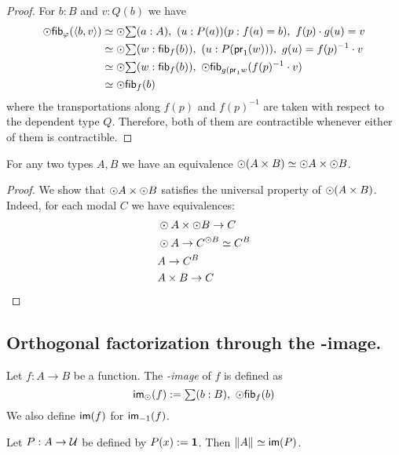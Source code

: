 \begin{proof}
For $b:B$ and $v:Q(b)$ we have
\begin{align*}
\modal\hfib{\varphi}{\pairr{b,v}} & \simeq \modal\sm{a:A}(u:P(a))(p:f(a)= b),\ f(p)\cdot g(u)= v\\
& \simeq \modal\sm{w:\hfib{f}b}(u:P(\proj1(w))),\ g(u)= f(p)^{-1}\cdot v\\
& \simeq \modal\sm{w:\hfib{f}b}\modal\hfib{g(\proj1 w}{f(p)^{-1}\cdot v}\\
& \simeq \modal\hfib{f}b
\end{align*}
where the transportations along $f(p)$ and $f(p)^{-1}$ are taken with respect to the dependent type $Q$. Therefore, both of them are
contractible whenever either of them is contractible.
\end{proof}

\begin{lem}\label{cor:trunc_prod}
For any two types $A,B$ we have an equivalence $\odot (A\times B) \simeq
\odot A \times \odot B$.
\end{lem}
\begin{proof}
 We show that $\odot A \times \odot B$ satisfies the universal property of $\odot (A\times B)$.
 Indeed, for each modal $C$ we have equivalences:
 \begin{align*}
&\odot A \times \odot B \to C\\
&\odot A \to C^{\odot B}\simeq C^B\\
&A\to C^B\\
&A\times B \to C
 \end{align*}
\end{proof}

\subsection{Orthogonal factorization through the \modal-image.}\label{sec:image_factorization}
\begin{defn}\label{def:modal_image}
Let $f:A\to B$ be a function. The \emph{\modal-image} of $f$ is defined as
\begin{equation*}
\im_\modal(f):=\sm{b:B} \modal\hfib{f}b
\end{equation*}
We also define $\mathsf{im}(f)$ for $\mathsf{im}_{-1}(f)$. 
\end{defn}


\begin{lem}
Let $P:A\to\mathcal{U}$ be defined by $P(x):=\mathbf{1}$. Then
$\Vert A\Vert_{}\simeq\mathsf{im}(P)$.
\end{lem}

